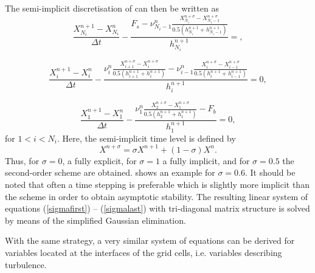 The semi-implicit discretisation of 
can then be written as
 \begin{equation}\label{sigmafirst}
 \displaystyle
 \frac{X^{n+1}_{N_i}-X^n_{N_i}}{\Delta t}
 -\frac{F_s
 -\nu^n_{N_i-1}\frac{X^{n+\sigma}_{N_i}-X^{n+\sigma}_{N_i-1}}{0.5(h^{n+1}_{N_i}+h^{n+1}_{N_i-1})}}{h^{n
 +1}_{N_i}}
 =
  \comma
 \end{equation}

\begin{equation}\label{Xdiscrete}
\displaystyle
\frac{X^{n+1}_i-X^n_i}{\Delta t}
-\frac{\nu^n_i\frac{X^{n+\sigma}_{i+1}-X^{n+\sigma}_{i}}{0.5(h^{n+1}_{i+1}+h^{n+1}_i)}
-\nu^n_{i-1}\frac{X^{n+\sigma}_{i}-X^{n+\sigma}_{i-1}}{0.5(h^{n+1}_i+h^{n+1}_{i-1})}}{h^{n
+1}_i}
=0
\comma
\end{equation}

\begin{equation}\label{sigmalast}
\displaystyle
\frac{X^{n+1}_1-X^n_1}{\Delta t}
-\frac{\nu^n_1\frac{X^{n+\sigma}_{2}-X^{n+\sigma}_{1}}{0.5(h^{n+1}_{2}+h^{n+1}_1)}
-F_b}{h^{n+1}_1}
=0
\comma
\end{equation}
for $1<i<N_i$. Here, the semi-implicit time level is defined by
\begin{equation}
  X^{n+\sigma}=\sigma X^{n+1}+(1-\sigma)X^n.
\end{equation}
Thus, for $\sigma=0$, a fully explicit, for $\sigma=1$ a fully
implicit, and for $\sigma=0.5$ the \cite{CrankNicolson47}
second-order scheme are obtained.  shows an
example for $\sigma=0.6$. It should be noted that often a time
stepping is preferable which is slightly more implicit than the
\cite{CrankNicolson47} scheme in order to obtain
asymptotic stability.  The resulting linear system of equations
(\ref{sigmafirst}) -- (\ref{sigmalast}) with tri-diagonal matrix
structure is solved by means of the simplified Gaussian elimination. 

With the same strategy, a very similar system of equations can be
derived for variables located at the interfaces of the grid cells,
i.e. variables describing turbulence.

